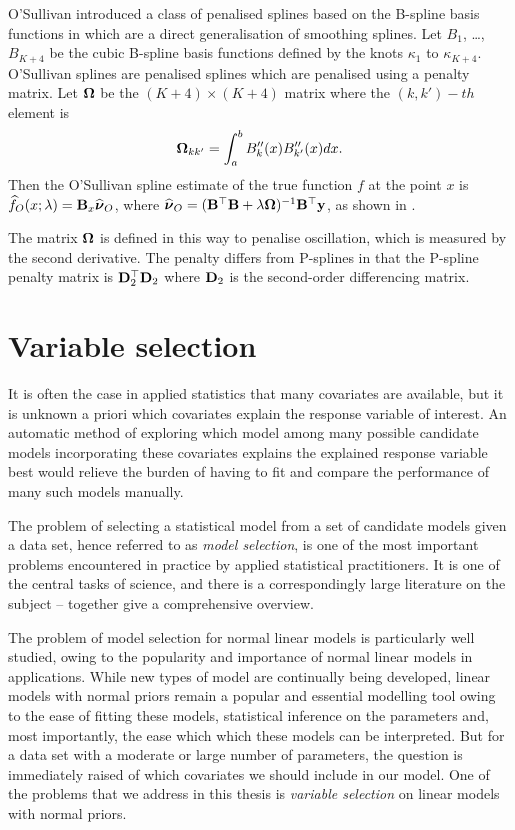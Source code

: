 O'Sullivan introduced a class of penalised splines based on the B-spline basis functions in
\cite{OSullivan1986} which are a direct generalisation of smoothing splines. Let $B_1$, \ldots, $B_{K+4}$ be
the cubic B-spline basis functions defined by the knots $\kappa_1$ to $\kappa_{K+4}$. O'Sullivan splines are
penalised splines which are penalised using a penalty matrix. Let ${\boldsymbol \Omega}$ be the $(K+4) \times (K+4)$ matrix
where the $(k, k')-th$ element is \[   {\boldsymbol \Omega}_{k k'} = \int_a^b B''_k(x) B''_{k'}(x) dx. \] Then the
O'Sullivan spline estimate of the true function $f$ at the point $x$ is $\widehat{f}_O(x; \lambda) = {\bf B}_x
\widehat{{\boldsymbol \nu}}_O$, where $\widehat{{\boldsymbol \nu}}_O = ({\bf B}^\top {\bf B} + \lambda {\boldsymbol\Omega})^{-1} {\bf B}^\top {\bf y}$, as shown in
\cite{ruppert_wand_carroll_2003}.

The matrix ${\boldsymbol \Omega}$ is defined in this way to penalise oscillation, which is measured by the second
derivative. The penalty differs from P-splines in that the P-spline penalty matrix is ${\bf D}_2^\top {\bf D}_2$ where
${\bf D}_2$ is the second-order differencing matrix.

\section{Variable selection}
It is often the case in applied statistics that many covariates are available, but it is unknown a priori
which covariates explain the response variable of interest. An automatic method of exploring which model among
many possible candidate models incorporating these covariates explains the explained response variable best
would relieve the burden of having to fit and compare the performance of many such models manually.

The problem of selecting a statistical model from a set of candidate models given a data set, hence referred
to as \emph{model selection}, is one of the most important problems encountered in practice by applied
statistical practitioners. It is one of the central tasks of science, and there is a correspondingly large
literature on the subject -- \cite{Claeskens:1251912, NengjunYi2013, Johnstone2009} together give a
comprehensive overview.

The problem of model selection for normal linear models is particularly well studied, owing to the popularity
and importance of normal linear models in applications. While new types of model are continually being
developed, linear models with normal priors remain a popular and essential modelling tool owing to the ease of
fitting these models, statistical inference on the parameters and, most importantly, the ease which which
these models can be interpreted. But for a data set with a moderate or large number of parameters, the
question is immediately raised of which covariates we should include in our model. One of the problems that we
address in this thesis is \emph{variable selection} on linear models with normal priors.

